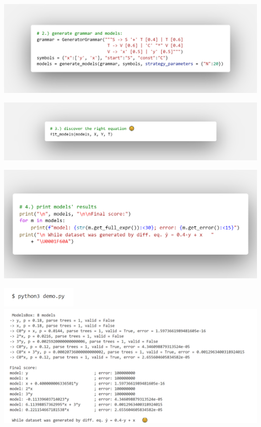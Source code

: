 \documentclass[t,usenames,dvipsnames]{beamer} %
\begin{document}

\begin{frame}
	\includegraphics[width=1.15\paperwidth]{code-shots/2grammar.png}
\end{frame}

\begin{frame}
	\begin{center}
		\includegraphics[width=1.2\paperwidth]{code-shots/3eqDisco.png}	
	\end{center}
\end{frame}

\begin{frame}
\includegraphics[width=1\paperwidth]{code-shots/4print-models.png}
\end{frame}

\begin{frame}
\includegraphics[height=1cm]
{code-shots/4_1runInTerminal2.png} \pause
\includegraphics[width=1\paperwidth]
{code-shots/4_2run-result-edd.png} 
\end{frame}
\end{document}
